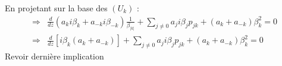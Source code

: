 \documentclass{article}
\begin{document}
En projetant sur la base des $(U_k)$ :
\begin{eqnarray*}
\Rightarrow& \frac{d}{dz} (a_ki\beta_k+a_{-k}i\beta_{-k})\frac{1}{\beta_{|k|}} + \sum_{j\neq 0} a_ji\beta_jp_{jk}+(a_k+a_{-k})\beta_k^2=0\\
\Rightarrow& \frac{d}{dz} [i\beta_k(a_k+a_{-k})]+\sum_{j\neq 0} a_ji\beta_jp_{jk}+(a_k+a_{-k})\beta_k^2=0
\end{eqnarray*}
Revoir dernière implication



\end{document}
